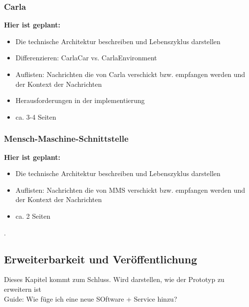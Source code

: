 \subsubsection{Carla}
\textbf{Hier ist geplant:}
\begin{itemize}
	\item Die technische Architektur beschreiben und Lebenszyklus darstellen
	\item Differenzieren: CarlaCar  vs. CarlaEnvironment
	\item Auflisten: Nachrichten die von Carla verschickt bzw. empfangen werden und der Kontext der Nachrichten
	\item Herausforderungen in der implementierung
	\item ca. 3-4 Seiten
\end{itemize}

\subsubsection{Mensch-Maschine-Schnittstelle}
\textbf{Hier ist geplant:}
\begin{itemize}
	\item Die technische Architektur beschreiben und Lebenszyklus darstellen
	\item Auflisten: Nachrichten die von MMS verschickt bzw. empfangen werden und der Kontext der Nachrichten
	\item ca. 2 Seiten
\end{itemize}
.
\subsection{Erweiterbarkeit und Veröffentlichung}
Dieses Kapitel kommt zum Schluss. Wird darstellen, wie der Prototyp zu erweitern ist\\
Guide: Wie füge ich eine neue SOftware + Service hinzu?